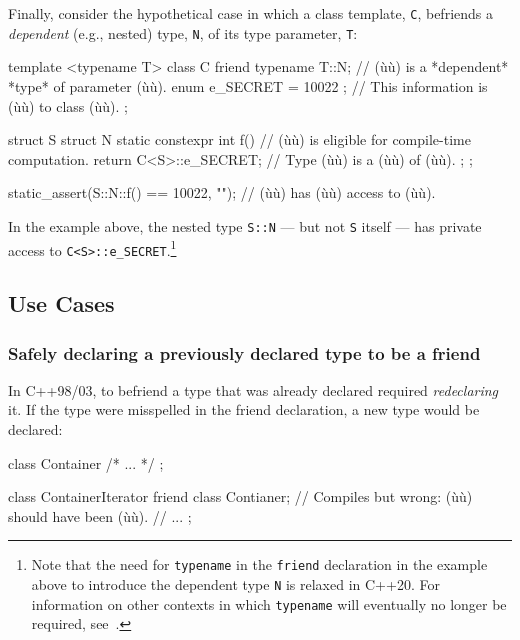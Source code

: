 Finally, consider the hypothetical case in which a class template,
\lstinline!C!, befriends a \emph{dependent} (e.g., nested) type, \lstinline!N!,
of its type parameter, \lstinline!T!:

\begin{emcppslisting}[emcppsbatch=e6]
template <typename T>
class C
{
    friend typename T::N;       // (ù{}ù) is a *dependent* *type* of parameter (ù{}ù).
    enum { e_SECRET = 10022 };  // This information is (ù{}ù) to class (ù{}ù).
};

struct S
{
    struct N
    {
        static constexpr int f()  // (ù{}ù) is eligible for compile-time computation.
        {
            return C<S>::e_SECRET;  // Type (ù{}ù) is a (ù{}ù) of (ù{}ù).
        }
    };
};

static_assert(S::N::f() == 10022, "");  // (ù{}ù) has (ù{}ù) access to (ù{}ù).
\end{emcppslisting}

\noindent In the example above, the nested type \lstinline!S::N! --- but not
\lstinline!S! itself --- has private access to \lstinline!C<S>::e_SECRET!.{\cprotect\footnote{Note that the need for \lstinline!typename! in the \lstinline!friend!
declaration in the example above to introduce the dependent type \lstinline!N! is relaxed
in C++20. For information on other contexts in which
\lstinline!typename! will eventually no longer be required, see~\cite{meredith20}.}}

\subsection[Use Cases]{Use Cases}\label{use-cases}

\subsubsection[Safely declaring a previously declared type to be a friend]{Safely declaring a previously declared type to be a friend}\label{safely-declaring-a-previously-declared-type-to-be-a-friend}

In C++98/03, to befriend a type that was already declared required
\emph{redeclaring} it. If the type were misspelled in the friend
declaration, a new type would be declared:

\begin{emcppslisting}
class Container { /* ... */ };

class ContainerIterator
{
    friend class Contianer;  // Compiles but wrong: (ù{}ù) should have been (ù{}ù).
    // ...
};
\end{emcppslisting}

